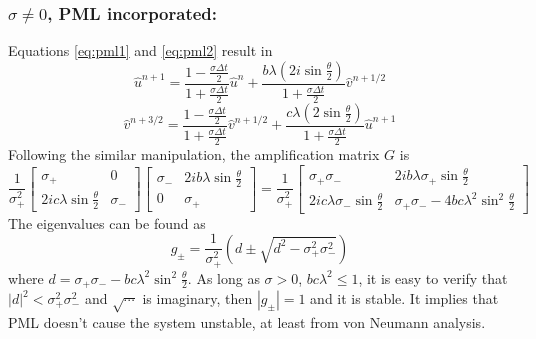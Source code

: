 \subsubsection{$\sigma\neq0$, PML incorporated:}
Equations \eqref{eq:pml1} and \eqref{eq:pml2} result in
\begin{equation}
 \hat{u}^{n+1}=\frac{1-\frac{\sigma\Delta t}{2}}{1+\frac{\sigma\Delta t}{2}}\hat{u}^n+\frac{b\lambda(2i\sin\frac{\theta}{2})}{1+\frac{\sigma\Delta t}{2}}\hat{v}^{n+1/2}
\end{equation}
\begin{equation}
 \hat{v}^{n+3/2}=\frac{1-\frac{\sigma\Delta t}{2}}{1+\frac{\sigma\Delta t}{2}}\hat{v}^{n+1/2}+
 \frac{c\lambda(2\sin\frac{\theta}{2})}{1+\frac{\sigma\Delta t}{2}}\hat{u}^{n+1}
\end{equation}
Following the similar manipulation, the amplification matrix $G$ is
\begin{equation}
 \frac{1}{\sigma_{+}^2}\begin{bmatrix}
                        \sigma_{+} & 0\\
                        2ic\lambda \sin\frac{\theta}{2} & \sigma_{-}
                       \end{bmatrix}
                       \begin{bmatrix}
                        \sigma_{-} & 2ib\lambda \sin\frac{\theta}{2}\\
                        0 & \sigma_{+}
                       \end{bmatrix}
=\frac{1}{\sigma_{+}^2}\begin{bmatrix}
                        \sigma_{+}\sigma_{-} & 2ib\lambda \sigma_{+}\sin\frac{\theta}{2}\\
                        2ic\lambda \sigma_{-}\sin\frac{\theta}{2} & \sigma_{+}\sigma_{-}-4bc\lambda^2\sin^2\frac{\theta}{2}  
			\end{bmatrix}                       
\end{equation}
The eigenvalues can be found as
\begin{equation}
 g_{\pm}=\frac{1}{\sigma_{+}^2}\left(
 d\pm \sqrt{ d^2-\sigma_{+}^2\sigma_{-}^2}
 \right)
\end{equation}
where $d=\sigma_{+}\sigma_{-}-bc\lambda^2\sin^2\frac{\theta}{2}$.
 As long as $\sigma>0$,  $bc\lambda^2\leq 1$, it is easy to verify that $|d|^2<\sigma_{+}^2\sigma_{-}^2$ and $\sqrt{\cdots}$ is imaginary, then $|g_{\pm}|=1$ and it is stable. It implies that PML doesn't cause the system unstable, at least from von Neumann analysis.

